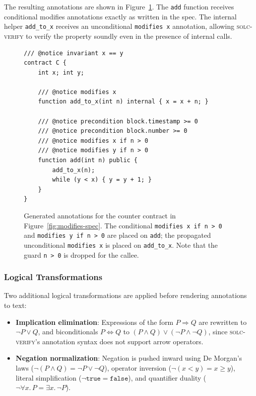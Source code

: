 The resulting annotations are shown in Figure~\ref{fig:modifies-output}. The \texttt{add} function receives conditional modifies annotations exactly as written in the spec. The internal helper \texttt{add\_to\_x} receives an unconditional \texttt{modifies x} annotation, allowing \textsc{solc-verify} to verify the property soundly even in the presence of internal calls.

\begin{figure}[h]
\centering
\begin{lstlisting}[style=solstyle]
/// @notice invariant x == y
contract C {
    int x; int y;

    /// @notice modifies x
    function add_to_x(int n) internal { x = x + n; }

    /// @notice precondition block.timestamp >= 0
    /// @notice precondition block.number >= 0
    /// @notice modifies x if n > 0
    /// @notice modifies y if n > 0
    function add(int n) public {
        add_to_x(n);
        while (y < x) { y = y + 1; }
    }
}
\end{lstlisting}
\caption{Generated annotations for the counter contract in Figure~\ref{fig:modifies-spec}. The conditional \texttt{modifies x if n > 0} and \texttt{modifies y if n > 0} are placed on \texttt{add}; the propagated unconditional \texttt{modifies x} is placed on \texttt{add\_to\_x}. Note that the guard \texttt{n > 0} is dropped for the callee.}
\label{fig:modifies-output}
\end{figure}

\subsubsection{Logical Transformations}

Two additional logical transformations are applied before rendering annotations to text:

\begin{itemize}
    \item \textbf{Implication elimination}: Expressions of the form $P \Rightarrow Q$ are rewritten to $\neg P \lor Q$, and biconditionals $P \Leftrightarrow Q$ to $(P \wedge Q) \lor (\neg P \wedge \neg Q)$, since \textsc{solc-verify}'s annotation syntax does not support arrow operators.
    
    \item \textbf{Negation normalization}: Negation is pushed inward using De Morgan's laws ($\neg(P \wedge Q) = \neg P \lor \neg Q$), operator inversion ($\neg(x < y) = x \geq y$), literal simplification ($\neg\texttt{true} = \texttt{false}$), and quantifier duality ($\neg\forall x.\, P = \exists x.\, \neg P$).
\end{itemize}

